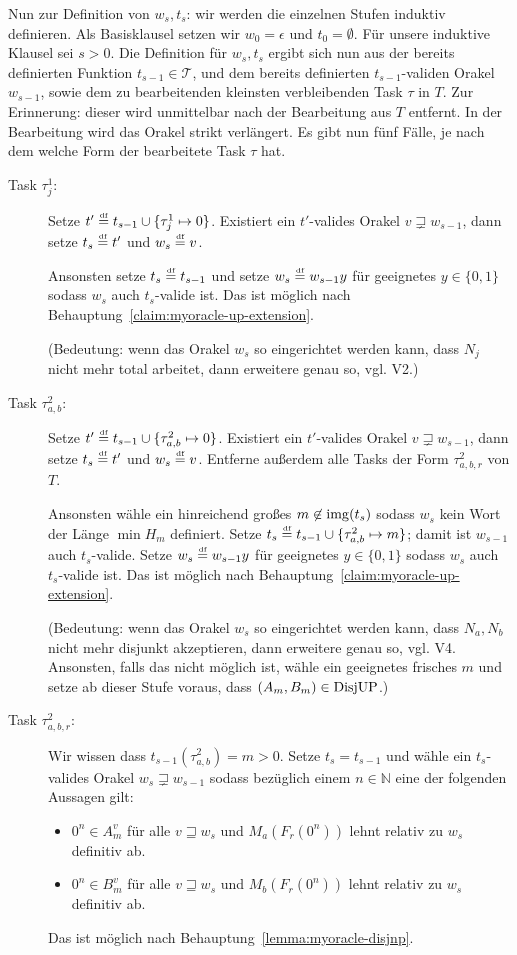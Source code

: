 Nun zur Definition von $w_s, t_s$: wir werden die einzelnen Stufen induktiv definieren. Als Basisklausel setzen wir $w_0 = \epsilon$ und $t_0 = \emptyset$.
Für unsere induktive Klausel sei $s>0$. Die Definition für $w_s, t_s$ ergibt sich nun aus der bereits definierten Funktion $t_{s-1}\in\mathcal T$, und dem bereits definierten $t_{s-1}$-validen Orakel $w_{s-1}$, sowie dem zu bearbeitenden kleinsten verbleibenden Task $\tau$ in $T$.
Zur Erinnerung: dieser wird unmittelbar nach der Bearbeitung aus $T$ entfernt. In der Bearbeitung wird das Orakel strikt verlängert.
Es gibt nun fünf Fälle, je nach dem welche Form der bearbeitete Task $\tau$ hat.
\begin{description}
    \item[Task $\tau^1_j$:] Setze $t'\stackrel{\text{\smash{\tiny df}}}{=} t_{s-1}\cup\{\tau^1_j\mapsto 0\}$. Existiert ein $t'$-valides Orakel $v\sqsupsetneq w_{s-1}$, dann setze $t_s\stackrel{\text{\smash{\tiny df}}}{=} t'$ und $w_s\stackrel{\text{\smash{\tiny df}}}{=} v$.

        Ansonsten setze $t_s\stackrel{\text{\smash{\tiny df}}}{=} t_{s-1}$ und setze $w_s\stackrel{\text{\smash{\tiny df}}}{=} w_{s-1}y$ für geeignetes $y\in\{0,1\}$ sodass $w_s$ auch $t_s$-valide ist. Das ist möglich nach Behauptung~\ref{claim:myoracle-up-extension}.

        (Bedeutung: wenn das Orakel $w_s$ so eingerichtet werden kann, dass $N_j$ nicht mehr total arbeitet, dann erweitere genau so, vgl. V2.) 

    \item[Task $\tau^2_{a,b}$:] Setze $t'\stackrel{\text{\smash{\tiny df}}}{=} t_{s-1}\cup\{\tau^2_{a,b}\mapsto 0\}$. Existiert ein $t'$-valides Orakel $v\sqsupsetneq w_{s-1}$, dann setze $t_s\stackrel{\text{\smash{\tiny df}}}{=} t'$ und $w_s\stackrel{\text{\smash{\tiny df}}}{=} v$. Entferne außerdem alle Tasks der Form $\tau^2_{a,b,r}$ von $T$.

        Ansonsten wähle ein hinreichend großes $m\not\in \operatorname{img}(t_s)$ sodass $w_s$ kein Wort der Länge $\min H_m$ definiert. Setze $t_s\stackrel{\text{\smash{\tiny df}}}{=} t_{s-1}\cup \{ \tau^2_{a,b}\mapsto m \}$; damit ist $w_{s-1}$ auch $t_s$-valide. Setze $w_s\stackrel{\text{\smash{\tiny df}}}{=} w_{s-1}y$ für geeignetes $y\in\{0,1\}$ sodass $w_s$ auch $t_s$-valide ist. Das ist möglich nach Behauptung~\ref{claim:myoracle-up-extension}.

        (Bedeutung: wenn das Orakel $w_s$ so eingerichtet werden kann, dass $N_a, N_b$ nicht mehr disjunkt akzeptieren, dann erweitere genau so, vgl. V4. Ansonsten, falls das nicht möglich ist, wähle ein geeignetes frisches $m$ und setze ab dieser Stufe voraus, dass $(A_m, B_m)\in \mathrm{DisjUP}$.) 

    \item[Task $\tau^2_{a,b,r}$:] Wir wissen dass $t_{s-1}(\tau^2_{a,b})=m>0$. Setze $t_s=t_{s-1}$ und wähle ein $t_s$-valides Orakel $w_s\sqsupsetneq w_{s-1}$ sodass bezüglich einem $n\in\mathbb N$ eine der folgenden Aussagen gilt:
        \begin{itemize}[nosep,endpenalty=10000]
            \item $0^n\in A_m^v$ für alle $v\sqsupseteq w_s$ und $M_a(F_r(0^n))$ lehnt relativ zu $w_s$ definitiv ab.
            \item $0^n\in B_m^v$ für alle $v\sqsupseteq w_s$ und $M_b(F_r(0^n))$ lehnt relativ zu $w_s$ definitiv ab.
        \end{itemize} Das ist möglich nach Behauptung~\ref{lemma:myoracle-disjnp}.


\end{description}
